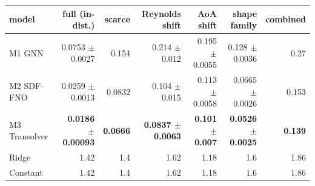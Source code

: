 \caption{Out-of-distribution field $p$ rel-$L_2$ by split (seed mean $\pm$ std where multiple seeds exist; \texttt{scarce}/\texttt{combined} are single-seed). Bold marks the best neural model per split.}
\label{tab:ood}
\providecommand{\tblfont}{\footnotesize}%
\tblfont
\setlength{\tabcolsep}{4pt}
\begin{tabular}{lrrrrrr}
\toprule
model & full (in-dist.) & scarce & Reynolds shift & AoA shift & shape family & combined \\
\midrule
M1 GNN & 0.0753 $\pm$ 0.0027 & 0.154 & 0.214 $\pm$ 0.012 & 0.195 $\pm$ 0.0055 & 0.128 $\pm$ 0.0036 & 0.27 \\
M2 SDF-FNO & 0.0259 $\pm$ 0.0013 & 0.0832 & 0.104 $\pm$ 0.015 & 0.113 $\pm$ 0.0058 & 0.0665 $\pm$ 0.0026 & 0.153 \\
M3 Transolver & \textbf{0.0186 $\pm$ 0.00093} & \textbf{0.0666} & \textbf{0.0837 $\pm$ 0.0063} & \textbf{0.101 $\pm$ 0.007} & \textbf{0.0526 $\pm$ 0.0025} & \textbf{0.139} \\
Ridge & 1.42 & 1.4 & 1.62 & 1.18 & 1.6 & 1.86 \\
Constant & 1.42 & 1.4 & 1.62 & 1.18 & 1.6 & 1.86 \\
\bottomrule
\end{tabular}
